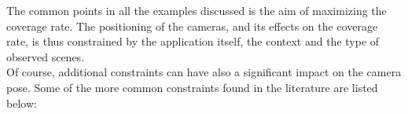 The common points in all the examples discussed is the aim of maximizing the coverage rate. The positioning of the cameras, and its effects on the coverage rate, is thus constrained by the application itself, the context  and the type of observed scenes.\\
Of course, additional constraints can have also a significant impact on the camera pose. Some of the more common constraints found in the literature are listed below:\\
